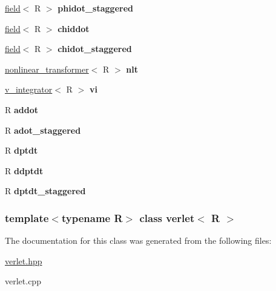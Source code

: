 \begin{DoxyCompactItemize}
\item 
\hypertarget{classverlet_a9f51b2f4d36a34414c014769b4304f4d}{
\hyperlink{classfield}{field}$<$ R $>$ {\bfseries phidot\_\-staggered}}
\label{classverlet_a9f51b2f4d36a34414c014769b4304f4d}

\item 
\hypertarget{classverlet_a52b954790a191420281577f1481e2863}{
\hyperlink{classfield}{field}$<$ R $>$ {\bfseries chiddot}}
\label{classverlet_a52b954790a191420281577f1481e2863}

\item 
\hypertarget{classverlet_a1e7cf84578e28a0c095c63b5d41c7449}{
\hyperlink{classfield}{field}$<$ R $>$ {\bfseries chidot\_\-staggered}}
\label{classverlet_a1e7cf84578e28a0c095c63b5d41c7449}

\item 
\hypertarget{classverlet_a232564ebeb528c9b52bbcc9daa81a909}{
\hyperlink{classnonlinear__transformer}{nonlinear\_\-transformer}$<$ R $>$ {\bfseries nlt}}
\label{classverlet_a232564ebeb528c9b52bbcc9daa81a909}

\item 
\hypertarget{classverlet_ac95f577e1f80514aec3c3f411a3d7e9c}{
\hyperlink{classv__integrator}{v\_\-integrator}$<$ R $>$ {\bfseries vi}}
\label{classverlet_ac95f577e1f80514aec3c3f411a3d7e9c}

\item 
\hypertarget{classverlet_ac46576e82d8a3e2b17a4e592ddaf6b19}{
R {\bfseries addot}}
\label{classverlet_ac46576e82d8a3e2b17a4e592ddaf6b19}

\item 
\hypertarget{classverlet_af978fa48d0bb1330d1648feba4259932}{
R {\bfseries adot\_\-staggered}}
\label{classverlet_af978fa48d0bb1330d1648feba4259932}

\item 
\hypertarget{classverlet_ae72e40fbb1555485c8dbe933b1149936}{
R {\bfseries dptdt}}
\label{classverlet_ae72e40fbb1555485c8dbe933b1149936}

\item 
\hypertarget{classverlet_a0903fd982ba22200c926aa8a6ccb3f2a}{
R {\bfseries ddptdt}}
\label{classverlet_a0903fd982ba22200c926aa8a6ccb3f2a}

\item 
\hypertarget{classverlet_ade5082a86641198153fad5aad8be887c}{
R {\bfseries dptdt\_\-staggered}}
\label{classverlet_ade5082a86641198153fad5aad8be887c}

\end{DoxyCompactItemize}
\subsubsection*{template$<$typename R$>$ class verlet$<$ R $>$}



The documentation for this class was generated from the following files:\begin{DoxyCompactItemize}
\item 
\hyperlink{verlet_8hpp}{verlet.hpp}\item 
verlet.cpp\end{DoxyCompactItemize}

